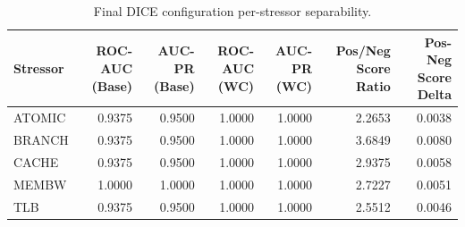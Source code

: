 \begin{table}[t]
\centering
\caption{Final DICE configuration per-stressor separability.}
\label{tab:dice_full_stressor}
\footnotesize
\begin{tabular}{lrrrrrr}
\toprule
Stressor & ROC-AUC (Base) & AUC-PR (Base) & ROC-AUC (WC) & AUC-PR (WC) & Pos/Neg Score Ratio & Pos-Neg Score Delta \\
\midrule
ATOMIC & 0.9375 & 0.9500 & 1.0000 & 1.0000 & 2.2653 & 0.0038 \\
BRANCH & 0.9375 & 0.9500 & 1.0000 & 1.0000 & 3.6849 & 0.0080 \\
CACHE & 0.9375 & 0.9500 & 1.0000 & 1.0000 & 2.9375 & 0.0058 \\
MEMBW & 1.0000 & 1.0000 & 1.0000 & 1.0000 & 2.7227 & 0.0051 \\
TLB & 0.9375 & 0.9500 & 1.0000 & 1.0000 & 2.5512 & 0.0046 \\
\bottomrule
\end{tabular}

\end{table}
